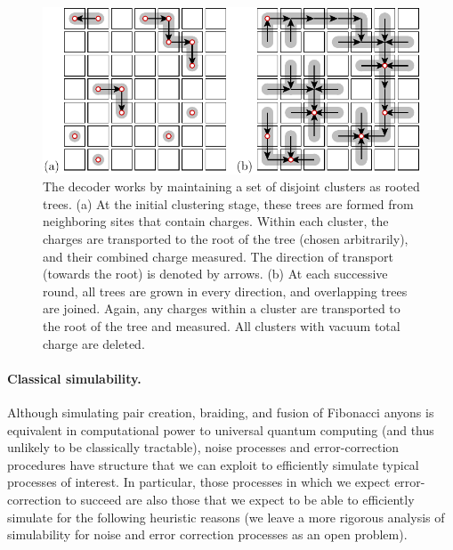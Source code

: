 \documentclass[aps, prl, letterpaper, twocolumn, superscriptaddress, notitlepage, 10pt]{revtex4-1}
\begin{document}
\begin{figure}[t!]
\begin{center}
	\includegraphics[width=1.0\columnwidth]{pic-decode.pdf}
\caption{The decoder works by maintaining a set of disjoint clusters as rooted trees.
(a) At the initial clustering stage, these trees are formed 
from neighboring sites that contain charges. Within each cluster, the 
charges are transported to the root of the tree (chosen 
arbitrarily), and their combined charge measured. The direction of transport 
(towards the root) is denoted by arrows.
(b) At each successive round, all trees are grown in 
every direction, and overlapping trees are joined. Again, any charges 
within a cluster are transported to the root of the 
tree and measured. All clusters with vacuum total charge are deleted.
\label{f:decode}
}
\end{center}
\vspace{-10pt}
\end{figure}

\paragraph{Classical simulability.}

Although simulating pair creation, braiding, and fusion of Fibonacci anyons is equivalent 
in computational power to universal quantum computing (and thus unlikely to be classically 
tractable), noise processes and error-correction procedures have structure that we can 
exploit to efficiently simulate typical processes of interest. In particular, those 
processes in which we expect error-correction to succeed are also those that we expect to 
be able to efficiently simulate for the following heuristic reasons 
(we leave a more rigorous analysis of simulability for noise 
and error correction processes as an open problem).
\end{document}
